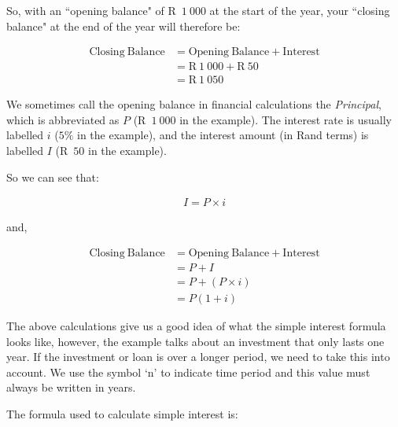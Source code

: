 So, with an ``opening balance" of R~$1~000$ at the start of the year, your ``closing balance" at the end of the year will therefore be:\par 
\begin{align*}
    \mathrm{Closing~Balance} &= \mathrm{Opening~Balance + Interest}\\
    &= \text{R}~1~000 + \text{R}~50\\
    &= \text{R}~1~050
\end{align*}

We sometimes call the opening balance in financial calculations the \textsl{Principal}, which is abbreviated as $P$ (R~$1~000$ in the example). The interest rate is usually labelled $i$ ($5\%$ in the example), and the interest amount (in Rand terms) is labelled $I$ (R~$50$ in the example).\par 

So we can see that:
        
\begin{align}
    I = P \times i
\end{align}

and,

\begin{align}
    \mathrm{Closing~Balance} &= \mathrm{Opening~Balance + Interest} \nonumber\\
    &= P + I \nonumber\\
    &= P + (P \times i)\nonumber\\
    &= P(1 + i)
\end{align}



The above calculations give us a good idea of what the simple interest formula looks like, however, the example talks
about an investment that only lasts one year. If the investment or loan is over a longer period, we need to take this
into account. We use the symbol ‘n’ to indicate time period and this value must always be written in years.\par

The formula used to calculate simple interest is:






